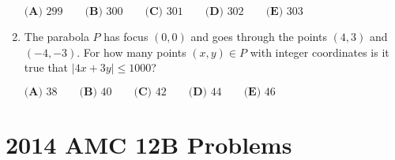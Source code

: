 \documentclass{article}
\begin{document}
\begin{enumerate}[label=\arabic*., itemsep=0.5em]
\(\textbf{(A) }299\qquad
\textbf{(B) }300\qquad
\textbf{(C) }301\qquad
\textbf{(D) }302\qquad
\textbf{(E) }303\qquad\)\par \vspace{0.5em}\item The parabola \(P\) has focus \((0,0)\) and goes through the points \((4,3)\) and \((-4,-3)\).  For how many points \((x,y)\in P\) with integer coordinates is it true that \(|4x+3y|\leq 1000\)?

\(\textbf{(A) }38\qquad
\textbf{(B) }40\qquad
\textbf{(C) }42\qquad
\textbf{(D) }44\qquad
\textbf{(E) }46\qquad\)\par \vspace{0.5em}
\end{enumerate}
\newpage\section*{2014 AMC 12B Problems}
\end{document}
